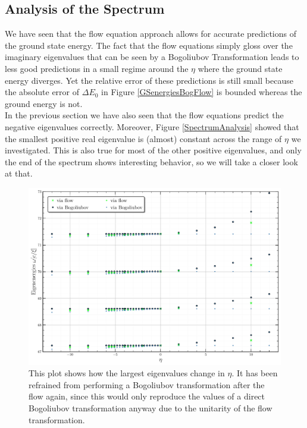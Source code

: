\subsection{Analysis of the Spectrum}
We have seen that the flow equation approach allows for accurate predictions of the ground state energy. The fact that the flow equations simply gloss over the imaginary eigenvalues that can be seen by a Bogoliubov Transformation leads to less good predictions in a small regime around the $\eta$ where the ground state energy diverges. Yet the relative error of these predictions is still small because the absolute error of $\Delta E_0$ in Figure \ref{GSenergiesBogFlow} is bounded whereas the ground energy is not.\\
In the previous section we have also seen that the flow equations predict the negative eigenvalues correctly. Moreover,  Figure \ref{SpectrumAnalysis} showed that the smallest positive real eigenvalue is (almost) constant across the range of $\eta$ we investigated. This is also true for most of the other positive eigenvalues, and only the end of the spectrum shows interesting behavior, so we will take a closer look at that.
\begin{figure}[H]
    \centering
    \includegraphics[width=\textwidth]{figures/plots/PDF/SpectralAnalysis.pdf}
    \caption[End of the spectrum of the Hamiltonian for different $\eta$]{This plot shows how the largest eigenvalues change in $\eta$. It has been refrained from performing a Bogoliubov transformation after the flow again, since this would only reproduce the values of a direct Bogoliubov transformation anyway due to the unitarity of the flow transformation.
}
    \label{EndOfSpectrumAnalysis}
\end{figure}
